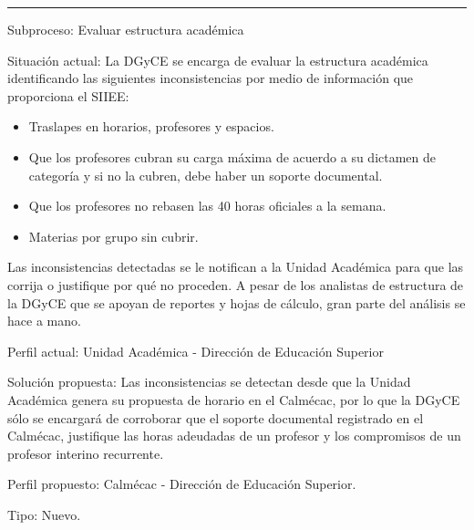 \hrule
\vspace{0.2cm}
\begin{Cdescription}
	\item[Subproceso:] Evaluar estructura académica
	\item[Situación actual:] La DGyCE se encarga de evaluar la estructura académica identificando las siguientes inconsistencias por medio de información que proporciona el SIIEE:
	\begin{itemize}
		\item Traslapes en horarios, profesores y espacios.
		\item Que los profesores cubran su carga máxima de acuerdo a su dictamen de categoría y si no la cubren, debe haber un soporte documental.
		\item Que los profesores no rebasen las 40 horas oficiales a la semana.
		\item Materias por grupo sin cubrir.
	\end{itemize}	 
	Las inconsistencias detectadas se le notifican a la Unidad Académica para que las corrija o justifique por qué no proceden. A pesar de los analistas de estructura de la DGyCE que se apoyan de reportes y hojas de cálculo, gran parte del análisis se hace a mano.
	\item[Perfil actual:] Unidad Académica - Dirección de Educación Superior
	\item[Solución propuesta:] Las inconsistencias se detectan desde que la Unidad Académica genera su propuesta de horario en el Calmécac, por lo que la DGyCE sólo se encargará de corroborar que el soporte documental registrado en el Calmécac, justifique las horas adeudadas de un profesor y los compromisos de un profesor interino recurrente.
	\item[Perfil propuesto:] Calmécac - Dirección de Educación Superior.
	\item[Tipo:] Nuevo.
\end{Cdescription}

